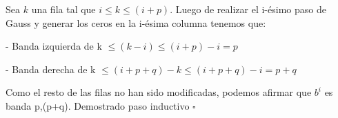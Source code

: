 Sea $k$ una fila tal que $i \leq k \leq (i+p)$. Luego de realizar el i-ésimo paso de Gauss y generar los ceros en la 
i-ésima columna tenemos que:

- Banda izquierda de k $\leq (k-i) \leq (i+p)-i = p$

- Banda derecha de k $ \leq (i+p+q)-k \leq (i+p+q)-i = p+q $

Como el resto de las filas no han sido modificadas, podemos afirmar que $b^{i}$ es banda p,(p+q). 
Demostrado paso inductivo $\square$

























